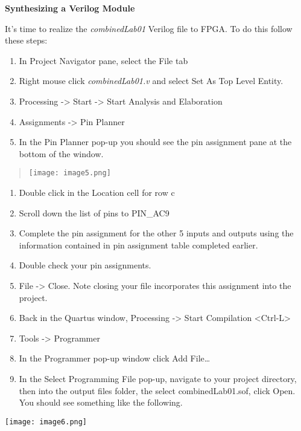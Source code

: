 \textbf{Synthesizing a Verilog Module}

It's time to realize the \emph{combinedLab01} Verilog file to FPGA. To
do this follow these steps:

\begin{enumerate}
\def\labelenumi{\arabic{enumi}.}
\item
  In Project Navigator pane, select the File tab
\item
  Right mouse click \emph{combinedLab01.v} and select Set As Top Level
  Entity.
\item
  Processing -\textgreater{} Start -\textgreater{} Start Analysis and
  Elaboration
\item
  Assignments -\textgreater{} Pin Planner
\item
  In the Pin Planner pop-up you should see the pin assignment pane at
  the bottom of the window.
\end{enumerate}

\begin{quote}
\texttt{[image: image5.png]}
\end{quote}

\begin{enumerate}
\def\labelenumi{\arabic{enumi}.}
\setcounter{enumi}{5}
\item
  Double click in the Location cell for row c
\item
  Scroll down the list of pins to PIN\_AC9
\item
  Complete the pin assignment for the other 5 inputs and outputs using
  the information contained in pin assignment table completed earlier.
\item
  Double check your pin assignments.
\item
  File -\textgreater{} Close. Note closing your file incorporates this
  assignment into the project.
\item
  Back in the Quartus window, Processing -\textgreater{} Start
  Compilation \textless Ctrl-L\textgreater{}
\item
  Tools -\textgreater{} Programmer
\item
  In the Programmer pop-up window click Add File\ldots{}
\item
  In the Select Programming File pop-up, navigate to your project
  directory, then into the output files folder, the select
  combinedLab01.sof, click Open. You should see something like the
  following.
\end{enumerate}

\texttt{[image: image6.png]}

